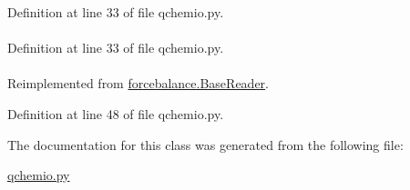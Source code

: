 \-Definition at line 33 of file qchemio.\-py.

\hypertarget{classforcebalance_1_1qchemio_1_1QCIn__Reader_a0de9131a4b3a62192ab094eec7f782be}{
\paragraph[{snum}]{}}\label{classforcebalance_1_1qchemio_1_1QCIn__Reader_a0de9131a4b3a62192ab094eec7f782be}


\-Definition at line 33 of file qchemio.\-py.

\hypertarget{classforcebalance_1_1qchemio_1_1QCIn__Reader_a1ff6018724f2760bb6dd32dd3c854328}{
\paragraph[{suffix}]{}}\label{classforcebalance_1_1qchemio_1_1QCIn__Reader_a1ff6018724f2760bb6dd32dd3c854328}


\-Reimplemented from \hyperlink{classforcebalance_1_1BaseReader_a48ef0584a1b6b4b6f8eb741ad8465db8}{forcebalance.\-Base\-Reader}.



\-Definition at line 48 of file qchemio.\-py.



\-The documentation for this class was generated from the following file\-:\begin{DoxyCompactItemize}
\item 
\hyperlink{qchemio_8py}{qchemio.\-py}\end{DoxyCompactItemize}
